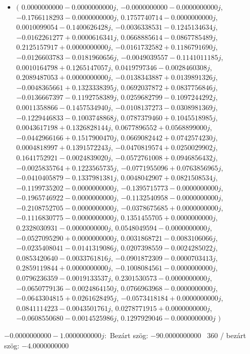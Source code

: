 \documentclass[14pt,a4paper]{article}
\begin{document}
\begin{itemize}
\item
$\big($
$0.0000000000-0.0000000000j$, $-0.0000000000-0.0000000000j$, $-0.1766118293-0.0000000000j$, $0.1757740714-0.0000000000j$, $0.0010099054-0.1400626428j$, $-0.0036338531-0.1245134634j$, $-0.0162261277+0.0000616341j$, $0.0668885614-0.0867785489j$, $0.2125157917+0.0000000000j$, $-0.0161732582+0.1186791690j$, $-0.0126603783-0.0181960656j$, $-0.0049039557-0.1141011185j$, $0.0010164798+0.1265147057j$, $0.0419797346-0.0028460308j$, $0.2089487053+0.0000000000j$, $-0.0138343887+0.0139891326j$, $-0.0048365661+0.1323338395j$, $0.0692037872+0.0837756846j$, $-0.0136667397-0.1192758389j$, $0.0259682799-0.1097244292j$, $0.0011358866-0.1457534940j$, $-0.0108137273-0.0308981369j$, $-0.1229446833-0.1003748868j$, $0.0787379460+0.1045518985j$, $0.0043617198+0.1326828144j$, $0.0677896552+0.0568899000j$, $-0.0442966166+0.1517900470j$, $0.0669082442+0.0742574230j$, $0.0004818997+0.1391572243j$, $-0.0470819574+0.0250029902j$, $0.1641752921-0.0024839020j$, $-0.0572761008+0.0946856432j$, $-0.0025835764+0.1223565735j$, $-0.0771955096+0.0763856965j$, $-0.0410405879-0.1337981381j$, $0.0048042907+0.0821508534j$, $-0.1199735202-0.0000000000j$, $-0.1395715773-0.0000000000j$, $-0.1965746922-0.0000000000j$, $-0.1132540958-0.0000000000j$, $-0.2108752705-0.0000000000j$, $-0.0378675685+0.0000000000j$, $-0.1116830775-0.0000000000j$, $0.1351455705+0.0000000000j$, $0.2328030931-0.0000000000j$, $0.0548049594-0.0000000000j$, $-0.0527095290+0.0000000000j$, $0.0031868721-0.0083106066j$, $-0.0235408041-0.0141319086j$, $0.0207398559-0.0024285022j$, $0.0853420640-0.0033761816j$, $-0.0901872309-0.0000703413j$, $0.2859119844+0.0000000000j$, $-0.1008084561-0.0000000000j$, $0.0796236359-0.0019133537j$, $0.2301530573-0.0000000000j$, $-0.0650779136-0.0024864150j$, $0.0766963968-0.0000000000j$, $-0.0643304815+0.0261628495j$, $-0.0573418184+0.0000000000j$, $0.0841114223-0.0043501761j$, $0.0278771915+0.0000000000j$, $-0.0608550680-0.0014525986j$, $0.1297929046-0.0000000000j$
$\big)$
\end{itemize}
$-0.0000000000-1.0000000000j$:\
Bezárt szög: $-90.0000000000$ \
360 / bezárt szög: $-4.0000000000$\
\end{document}
